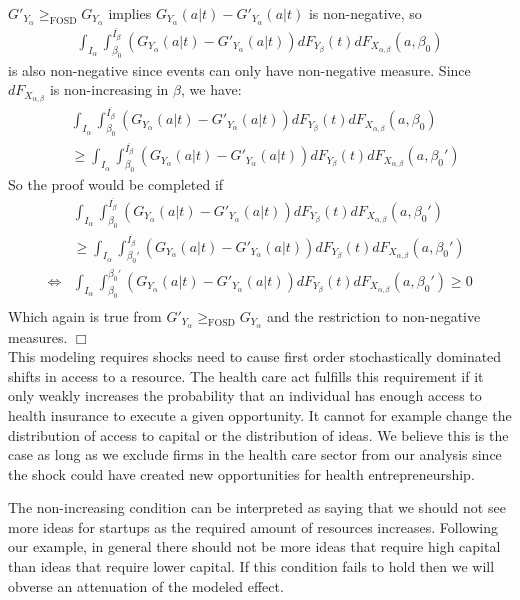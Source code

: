 \documentclass[12pt]{article}
\begin{document}
$G'_{Y_\alpha} \mathop{\ge}_{\text{FOSD}} G_{Y_\alpha}$ implies $G_{Y_{\alpha}}(a|t) - G'_{Y_{\alpha}}(a|t)$ is non-negative, so 
\begin{align*}
\int_{I_{\alpha}} \int_{\beta_0}^{\overline{I_{\beta}}} (G_{Y_{\alpha}}(a|t) - G'_{Y_{\alpha}}(a|t)) dF_{Y_{\beta}}(t) dF_{X_{\alpha,\beta}}(a,\beta_0)
\end{align*}
is also non-negative since events can only have non-negative measure. Since $dF_{X_{\alpha,\beta}}$ is non-increasing in $\beta$, we have: 
\begin{align*}
& \int_{I_{\alpha}} \int_{\beta_0}^{\overline{I_{\beta}}} (G_{Y_{\alpha}}(a|t) - G'_{Y_{\alpha}}(a|t)) dF_{Y_{\beta}}(t) dF_{X_{\alpha,\beta}}(a,\beta_0)\\
& \ge \int_{I_{\alpha}} \int_{\beta_0}^{\overline{I_{\beta}}} (G_{Y_{\alpha}}(a|t) - G'_{Y_{\alpha}}(a|t)) dF_{Y_{\beta}}(t) dF_{X_{\alpha,\beta}}(a,\beta_0')
\end{align*}
So the proof would be completed if
\begin{align*}
& \int_{I_{\alpha}} \int_{\beta_0}^{\overline{I_{\beta}}} (G_{Y_{\alpha}}(a|t) - G'_{Y_{\alpha}}(a|t)) dF_{Y_{\beta}}(t) dF_{X_{\alpha,\beta}}(a,\beta_0') \\
&  \ge  \int_{I_{\alpha}} \int_{\beta_0'}^{\overline{I_{\beta}}} (G_{Y_{\alpha}}(a|t) - G'_{Y_{\alpha}}(a|t)) dF_{Y_{\beta}}(t) dF_{X_{\alpha,\beta}}(a,\beta_0')\\
\iff & \int_{I_{\alpha}} \int_{\beta_0}^{\beta_0'} (G_{Y_{\alpha}}(a|t) - G'_{Y_{\alpha}}(a|t)) dF_{Y_{\beta}}(t) dF_{X_{\alpha,\beta}}(a,\beta_0') \ge 0\\
\end{align*}
Which again is true from $G'_{Y_\alpha} \mathop{\ge}_{\text{FOSD}} G_{Y_\alpha}$ and the restriction to non-negative measures. $\Box$ \\

This modeling requires shocks need to cause first order stochastically dominated shifts in access to a resource. The health care act fulfills this requirement if it only weakly increases the probability that an individual has enough access to health insurance to execute a given opportunity. It cannot for example change the distribution of access to capital or the distribution of ideas. We believe this is the case as long as we exclude firms in the health care sector from our analysis since the shock could have created new opportunities for health entrepreneurship.  

The non-increasing condition can be interpreted as saying that we should not see more ideas for startups as the required amount of resources increases. Following our example, in general there should not be more ideas that require high capital than ideas that require lower capital. If this condition fails to hold then we will obverse an attenuation of the modeled effect. 
\end{document}
